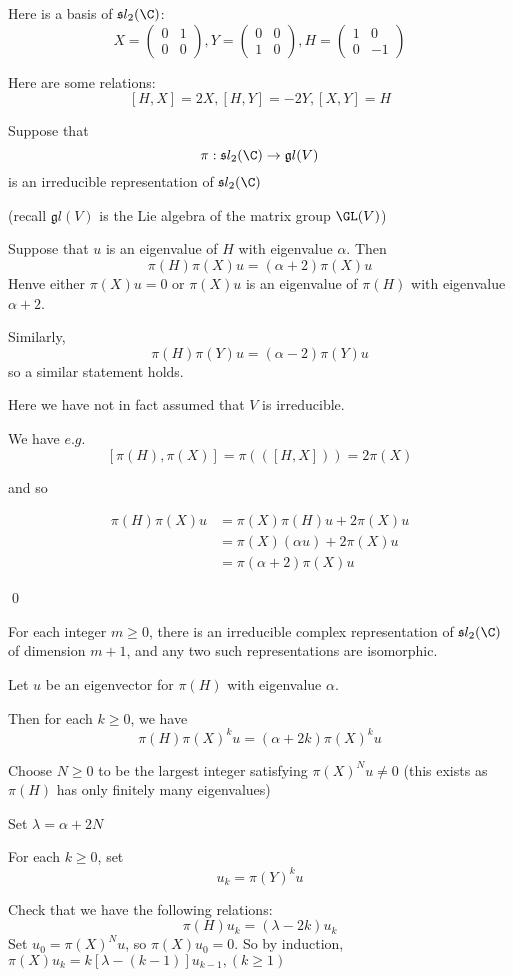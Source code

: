 \documentclass[x11names,reqno,14pt]{extarticle}
\newcommand{\pmat}[4]{\begin{pmatrix} #1 & #2 \\ #3 & #4 \end{pmatrix}}
\newcommand{\mk}[1]{\mathfrak{#1}}
\newcommand{\g}{\mk{g}}
\begin{document}
Here is a basis of $\mk{s}l_2(\C)$: 
\[
X = \pmat{0}{1}{0}{0}, Y = \pmat{0}{0}{1}{0}, H = \pmat{1}{0}{0}{-1}
\]

Here are some relations:
\[
[H,X] = 2X, [H, Y] = -2Y, [X, Y] = H
\]

Suppose that 
\[
\pi:\mk{s}l_2(\C)\to \g l(V)
\]
is an irreducible representation of $\mk{s}l_2(\C)$

(recall $\g l(V)$ is the Lie algebra of the matrix group $\GL(V)$)

\lem

Suppose that $u$ is an eigenvalue of $H$ with eigenvalue $\alpha$. Then
\[
\pi(H)\pi(X)u = (\alpha + 2)\pi(X)u
\]
Henve either $\pi(X)u = 0$ or $\pi(X)u$ is an eigenvalue of $\pi(H)$ with eigenvalue $\alpha + 2$. 

Similarly, 
\[
\pi(H)\pi(Y)u = (\alpha - 2)\pi(Y)u
\]
so a similar statement holds. 

Here we have not in fact assumed that $V$ is irreducible. 

\proof

We have $e.g.$ 
\[
[\pi(H),\pi(X)] = \pi(([H,X])) = 2\pi(X)
\]

and so 

\begin{align*}
\pi(H)\pi(X)u & = \pi(X)\pi(H)u + 2\pi(X)u\\
				& = \pi(X)(\alpha u) + 2\pi(X)u \\
& = \pi(\alpha + 2)\pi(X)u
\end{align*}

\qed

\thm 

For each integer $m \geq0$, there is an irreducible complex representation of $\mk{s}l_2(\C)$ of dimension $m + 1$, and any two such representations are isomorphic. 

\proof

Let $u$ be an eigenvector for $\pi(H)$ with eigenvalue $\alpha$. 

Then for each $k \geq0$, we have
\[
\pi(H)\pi(X)^ku = (\alpha + 2k)\pi(X)^ku
\]

Choose $N \geq 0$ to be the largest integer satisfying $\pi(X)^Nu \neq 0$ (this exists as $\pi(H)$ has only finitely many eigenvalues)

Set $\lambda = \alpha + 2N$

For each $k\geq0$, set
\[
u_k = \pi(Y)^ku
\]

Check that we have the following relations:
\[
\pi(H)u_k = (\lambda- 2k)u_k
\]
Set $u_0 = \pi(X)^Nu$, so $\pi(X)u_0 = 0$. So by induction, $\pi(X)u_k = k[\lambda-(k-1)]u_{k-1}, (k\geq1)$
\end{document}

